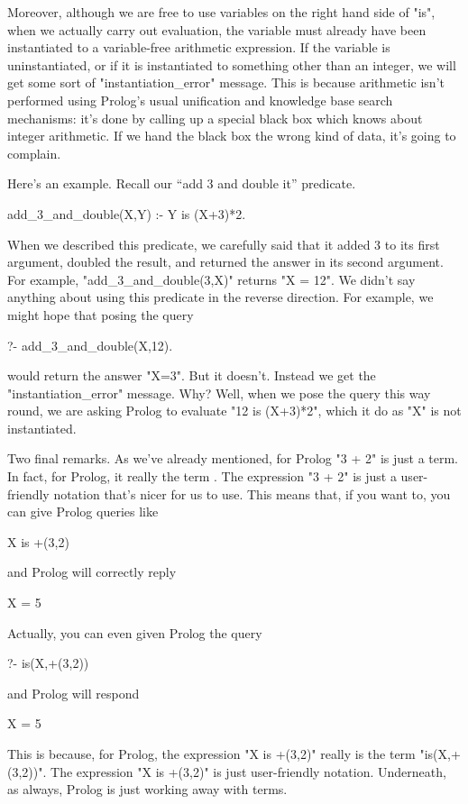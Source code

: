 Moreover, although we are free to use variables on the right hand side
of "is", when we actually carry out evaluation, the variable must
already have been instantiated to a variable-free arithmetic
expression.  If the variable is uninstantiated, or if it is
instantiated to something other than an integer, we will get some sort
of "instantiation_error" message.  This is because arithmetic isn't
performed using Prolog's usual unification and knowledge base search
mechanisms: it's done by calling up a special black box which knows
about integer arithmetic.  If we hand the black box the wrong kind of
data, it's going to complain.

Here's an example. Recall our ``add 3 and double it''
predicate.
\begin{LPNcodedisplay}
add_3_and_double(X,Y) :- Y is (X+3)*2.
\end{LPNcodedisplay}
When we described this predicate, we carefully said that it added 3 to
its first argument, doubled the result, and returned the answer in its
second argument.  For example, "add_3_and_double(3,X)" returns
"X = 12".  We didn't say anything about using this predicate in
the reverse direction.  For example, we might hope that posing the
query
\begin{LPNcodedisplay}
?- add_3_and_double(X,12).
\end{LPNcodedisplay}
would return the answer "X=3".   But it doesn't. Instead we
get the "instantiation_error" message.  Why?  Well, when we pose
the query this way round, we are asking Prolog to evaluate
"12 is (X+3)*2", which it  do as "X"
is not instantiated.

Two final remarks.  As we've already mentioned, for Prolog "3 + 2"
is just a term.  In fact, for Prolog, it really  the term
.  The expression "3 + 2" is just a user-friendly
notation that's nicer for us to use.  This means that, if you
want to, you can give Prolog queries like
\begin{LPNcodedisplay}
X is +(3,2)
\end{LPNcodedisplay}
and Prolog will correctly reply
\begin{LPNcodedisplay}
X = 5
\end{LPNcodedisplay}
Actually, you can even given Prolog the query
\begin{LPNcodedisplay}
?- is(X,+(3,2))
\end{LPNcodedisplay}
and Prolog will respond
\begin{LPNcodedisplay}
X = 5
\end{LPNcodedisplay}
This is because, for Prolog, the expression "X is +(3,2)" really is
the term "is(X,+(3,2))".  The expression "X is +(3,2)" is just
user-friendly notation.  Underneath, as always, Prolog is just working
away with terms.

